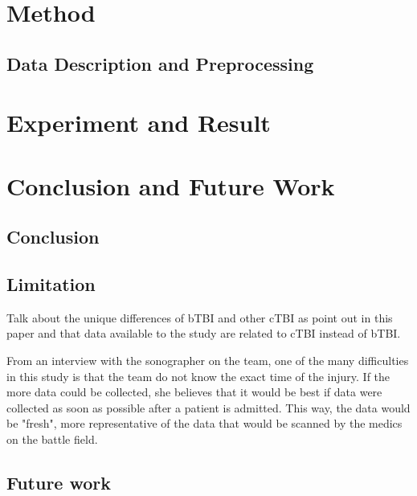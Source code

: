 \documentclass [11pt, proquest] {uwthesis}[2020/02/24]
\begin{document}

\chapter {Method}

\section{Data Description and Preprocessing}







\chapter {Experiment and Result}





\chapter {Conclusion and Future Work}

\section{Conclusion}



\section{Limitation}
Talk about the unique differences of bTBI and other cTBI as point out in this 
paper \cite{explosive} and that data available to the study are related to 
cTBI instead of bTBI.

From an interview with the sonographer on the team, one of the many difficulties in this
study is that the team do not know the exact time of the injury. If the more data could be
collected, she believes that it would be best if data were collected as soon as possible after
a patient is admitted. This way, the data would be "fresh", more representative of the data that
would be scanned by the medics on the battle field.


\section{Future work}
\end{document}
